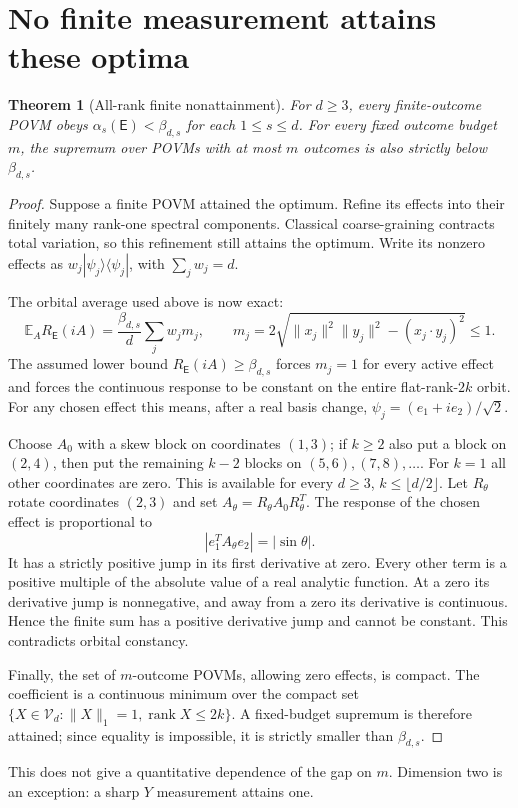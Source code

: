 \documentclass[11pt]{article}
\newtheorem{theorem}{Theorem}
\newcommand{\rank}{\operatorname{rank}}
\newcommand{\E}{\mathsf E}
\newcommand{\V}{\mathcal V}
\begin{document}
\section{No finite measurement attains these optima}
\begin{theorem}[All-rank finite nonattainment]
For $d\geq3$, every finite-outcome POVM obeys
$\alpha_s(\E)<\beta_{d,s}$ for each $1\leq s\leq d$.
For every fixed outcome budget $m$, the supremum over POVMs with at
most $m$ outcomes is also strictly below $\beta_{d,s}$.
\end{theorem}
\begin{proof}
Suppose a finite POVM attained the optimum. Refine its effects into
their finitely many rank-one spectral components. Classical
coarse-graining contracts total variation, so this refinement still
attains the optimum. Write its nonzero effects as
$w_j|\psi_j\rangle\langle\psi_j|$, with $\sum_jw_j=d$.

The orbital average used above is now exact:
\[
\mathbb E_A R_{\E}(iA)
=\frac{\beta_{d,s}}{d}\sum_jw_j m_j,\qquad
m_j=2\sqrt{\|x_j\|^2\|y_j\|^2-(x_j\cdot y_j)^2}\leq1.
\]
The assumed lower bound $R_{\E}(iA)\geq\beta_{d,s}$ forces
$m_j=1$ for every active effect and forces the continuous response
to be constant on the entire flat-rank-$2k$ orbit.
For any chosen effect this means, after a real basis change,
$\psi_j=(e_1+ie_2)/\sqrt2$.

Choose $A_0$ with a skew block on coordinates $(1,3)$; if $k\geq2$
also put a block on $(2,4)$, then put the remaining $k-2$ blocks
on $(5,6),(7,8),\ldots$. For $k=1$ all other coordinates are
zero. This is available for every $d\geq3$, $k\leq\lfloor d/2\rfloor$.
Let $R_\theta$ rotate coordinates $(2,3)$ and set
$A_\theta=R_\theta A_0R_\theta^T$.
The response of the chosen effect is proportional to
\[
|e_1^T A_\theta e_2|=|\sin\theta|.
\]
It has a strictly positive jump in its first derivative at zero.
Every other term is a positive multiple of the absolute value of
a real analytic function. At a zero its derivative jump is
nonnegative, and away from a zero its derivative is continuous.
Hence the finite sum has a positive derivative jump and cannot be
constant. This contradicts orbital constancy.

Finally, the set of $m$-outcome POVMs, allowing zero effects, is
compact. The coefficient is a continuous minimum over the compact
set $\{X\in\V_d:\|X\|_1=1,\rank X\leq2k\}$.
A fixed-budget supremum is therefore attained; since equality is
impossible, it is strictly smaller than $\beta_{d,s}$.
\end{proof}
This does not give a quantitative dependence of the gap on $m$.
Dimension two is an exception: a sharp $Y$ measurement attains one.
\end{document}
